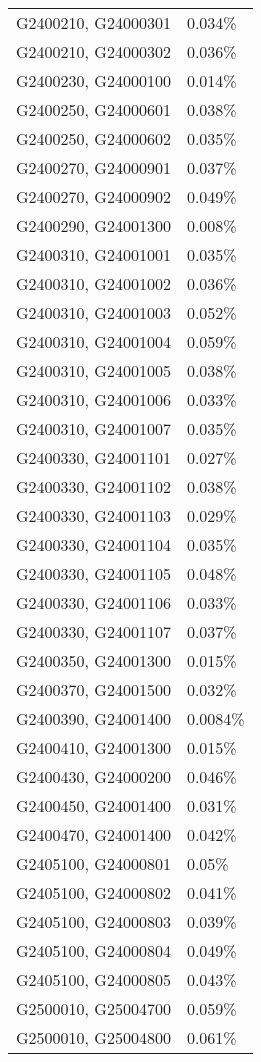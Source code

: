 \begin{longtable}[]{@{}ll@{}}
G2400210, G24000301 & 0.034\% \\
G2400210, G24000302 & 0.036\% \\
G2400230, G24000100 & 0.014\% \\
G2400250, G24000601 & 0.038\% \\
G2400250, G24000602 & 0.035\% \\
G2400270, G24000901 & 0.037\% \\
G2400270, G24000902 & 0.049\% \\
G2400290, G24001300 & 0.008\% \\
G2400310, G24001001 & 0.035\% \\
G2400310, G24001002 & 0.036\% \\
G2400310, G24001003 & 0.052\% \\
G2400310, G24001004 & 0.059\% \\
G2400310, G24001005 & 0.038\% \\
G2400310, G24001006 & 0.033\% \\
G2400310, G24001007 & 0.035\% \\
G2400330, G24001101 & 0.027\% \\
G2400330, G24001102 & 0.038\% \\
G2400330, G24001103 & 0.029\% \\
G2400330, G24001104 & 0.035\% \\
G2400330, G24001105 & 0.048\% \\
G2400330, G24001106 & 0.033\% \\
G2400330, G24001107 & 0.037\% \\
G2400350, G24001300 & 0.015\% \\
G2400370, G24001500 & 0.032\% \\
G2400390, G24001400 & 0.0084\% \\
G2400410, G24001300 & 0.015\% \\
G2400430, G24000200 & 0.046\% \\
G2400450, G24001400 & 0.031\% \\
G2400470, G24001400 & 0.042\% \\
G2405100, G24000801 & 0.05\% \\
G2405100, G24000802 & 0.041\% \\
G2405100, G24000803 & 0.039\% \\
G2405100, G24000804 & 0.049\% \\
G2405100, G24000805 & 0.043\% \\
G2500010, G25004700 & 0.059\% \\
G2500010, G25004800 & 0.061\% \\

\end{longtable}
